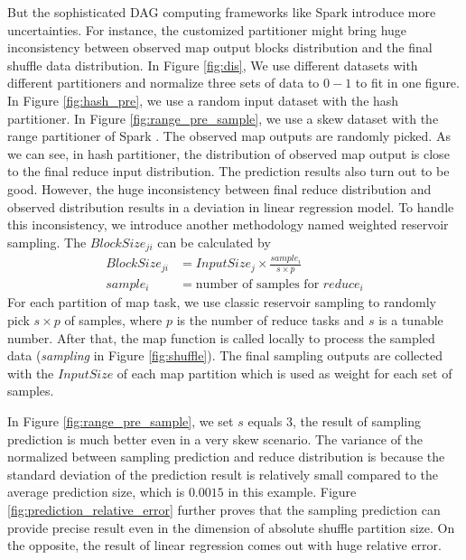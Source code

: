 But the sophisticated DAG computing frameworks like Spark introduce more uncertainties. For instance, the customized partitioner might bring huge inconsistency between observed map output blocks distribution and the final shuffle data distribution. In Figure \ref{fig:dis}, We use different datasets with different partitioners and normalize three sets of data to $0-1$ to fit in one figure. In Figure \ref{fig:hash_pre}, we use a random input dataset with the hash partitioner. In Figure \ref{fig:range_pre_sample}, we use a skew dataset with the range partitioner of Spark \cite{apachespark}.
The observed map outputs are randomly picked. As we can see, in hash partitioner, the distribution of observed map output is close to the final reduce input distribution. The prediction results also turn out to be good. However, the huge inconsistency between final reduce distribution and observed distribution results in a deviation in linear regression model.
To handle this inconsistency, we introduce another methodology named weighted reservoir sampling. The $BlockSize_{ji}$ can be calculated by
\begin{equation}
\label{equationsample}
\begin{aligned}
	BlockSize_{ji} &= {{InputSize_j \times \frac{sample_i}{s \times p}}} \\
	sample_i &= \text{number of samples for $reduce_i$}
\end{aligned}
\end{equation}
For each partition of map task, we use classic reservoir sampling to randomly pick $s \times p$ of samples, where $p$ is the number of reduce tasks and $s$ is a tunable number. After that, the map function is called locally to process the sampled data (\textit{sampling} in Figure \ref{fig:shuffle}). The final sampling outputs are collected with the $InputSize$ of each map partition which is used as weight for each set of samples.

In Figure \ref{fig:range_pre_sample}, we set $s$ equals $3$, the result of sampling prediction is much better even in a very skew scenario. The variance of the normalized between sampling prediction and reduce distribution is because the standard deviation of the prediction result is relatively small compared to the average prediction size, which is $0.0015$ in this example. Figure \ref{fig:prediction_relative_error} further proves that the sampling prediction can provide precise result even in the dimension of absolute shuffle partition size. On the opposite, the result of linear regression comes out with huge relative error.

